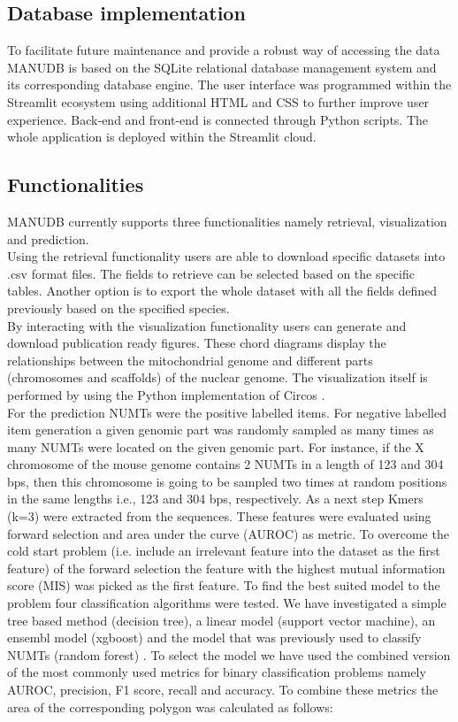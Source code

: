 \documentclass{article}
\begin{document}
\subsection{Database implementation}
To facilitate future maintenance and provide a robust way of accessing the data MANUDB is based on the SQLite relational database management system \cite{sqlite} and its corresponding database engine. The user interface was programmed within the Streamlit ecosystem using additional HTML and CSS to further improve user experience. Back-end and front-end is connected through Python scripts. The whole application is deployed within the Streamlit cloud.
\subsection{Functionalities}
MANUDB currently supports three functionalities namely retrieval, visualization and prediction.\\Using the retrieval functionality users are able to download specific datasets into .csv format files. The fields to retrieve can be selected based on the specific tables. Another option is to export the whole dataset with all the fields defined previously based on the specified species.\\By interacting with the visualization functionality users can generate and download publication ready figures. These chord diagrams display the relationships between the mitochondrial genome and different parts (chromosomes and scaffolds) of the nuclear genome. The visualization itself is performed by using the Python implementation of Circos \cite{circos,pycirclize}.\\For the prediction NUMTs were the positive labelled items. For negative labelled item generation a given genomic part was randomly sampled as many times as many NUMTs were located on the given genomic part. For instance, if the X chromosome of the mouse genome contains 2 NUMTs in a length of 123 and 304 bps, then this chromosome is going to be sampled two times at random positions in the same lengths i.e., 123 and 304 bps, respectively. As a next step Kmers (k=3) were extracted from the sequences. These features were evaluated using forward selection and area under the curve (AUROC) as metric. To overcome the cold start problem (i.e. include an irrelevant feature into the dataset as the first feature) of the forward selection the feature with the highest mutual information score (MIS) was picked as the first feature. To find the best suited model to the problem four classification algorithms were tested. We have investigated a simple tree based method (decision tree), a linear model (support vector machine), an ensembl model (xgboost) and the model that was previously used to classify NUMTs (random forest) \cite{biro2024mitochondrial}. To select the model we have used the combined version of the most commonly used metrics for binary classification problems \cite{metrics} namely AUROC, precision, F1 score, recall and accuracy. To combine these metrics the area of the corresponding polygon was calculated as follows:\\
\end{document}

